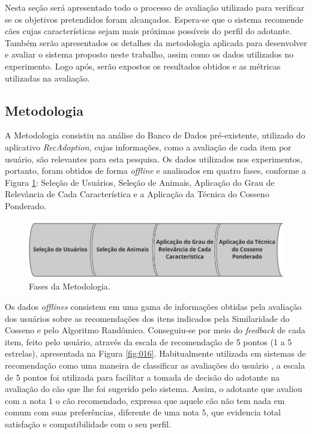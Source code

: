 \documentclass[portuguese]{textolivre}
\begin{document}
Nesta seção será apresentado todo o processo de avaliação utilizado para verificar se os objetivos pretendidos foram alcançados. Espera-se que o sistema recomende cães cujas características sejam mais próximas possíveis do perfil do adotante. Também serão apresentados os detalhes da metodologia aplicada para desenvolver e avaliar o sistema proposto neste trabalho, assim como os dados utilizados no experimento. Logo após, serão expostos os resultados obtidos e as métricas utilizadas na avaliação.

\subsection{Metodologia}

A Metodologia consistiu na análise do Banco de Dados pré-existente, utilizado do aplicativo \textit{RecAdoption}, cujas informações, como a avaliação de cada item por usuário, são relevantes para esta pesquisa. Os dados utilizados nos experimentos, portanto, foram obtidos de forma \textit{offline} e analisados em quatro fases, conforme a Figura \ref{fig:015}: Seleção de Usuários, Seleção de Animais, Aplicação do Grau de Relevância de Cada Característica e a Aplicação da Técnica do Cosseno Ponderado.

\begin{figure}[H]
	\centering
	\includegraphics[scale=0.80]{imagens/fig-015.PNG}
	\caption{Fases da Metodologia.}
	\label{fig:015}
\end{figure}

Os dados \emph{offlines} consistem em uma gama de informações obtidas pela avaliação dos usuários sobre as recomendações dos itens indicados pela Similaridade do Cosseno e pelo Algoritmo Randômico. Conseguiu-se por meio do \emph{feedback} de cada item, feito pelo usuário, através da escala de recomendação de 5 pontos (1 a 5 estrelas), apresentada na Figura \ref{fig:016}. Habitualmente utilizada em sistemas de recomendação como uma maneira de classificar as avaliações do usuário \cite{Aggarwal2016}, a escala de 5 pontos foi utilizada para facilitar a tomada de decisão do adotante na avaliação do cão que lhe foi sugerido pelo sistema. Assim, o adotante que avaliou com a nota $1$ o cão recomendado, expressa que aquele cão não tem nada em comum com suas preferências, diferente de uma nota $5$, que evidencia total satisfação e compatibilidade com o seu perfil.
\end{document}
